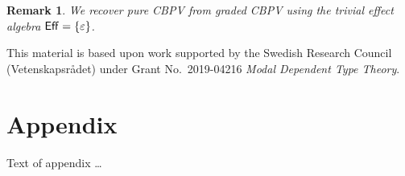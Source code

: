 \documentclass[acmsmall,review,anonymous]{acmart}\settopmatter{printfolios=true,printccs=false,printacmref=false}
\newtheorem{remark}{Remark}
\begin{document}
\begin{remark}\label{rem:cbpv}
  We recover pure CBPV from graded CBPV using the trivial effect
  algebra $\mathsf{Eff} = \{\varepsilon\}$.
\end{remark}

\begin{example}

\end{example}



\begin{acks}                            %

  This material is based upon work supported by the
  Swedish Research Council (Vetenskapsrådet)
  under Grant
  No.~2019-04216 \emph{Modal Dependent Type Theory}.

\end{acks}





\appendix
\section{Appendix}

Text of appendix \ldots
\end{document}

